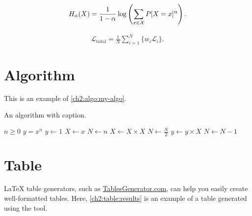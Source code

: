 \begin{equation}
\label{ch2:eq:renyi}
H_{\alpha}(X) =
\frac{1}{1-\alpha}
\log \left(\sum_{x \in {\cal X}}P[X=x]^{\alpha} \right) .
\end{equation}

\begin{equation}
\label{ch2:eq:total-loss}
\begin{aligned}
\mathcal{L}_{\textrm{total}} = \frac{1}{N}\sum_{i=1}^{N}\{w_i\mathcal{L}_i\}.
\end{aligned}
\end{equation}

\section{Algorithm}
\begin{paragraph}
This is an example of \autoref{ch2:algo:my-algo}.
\end{paragraph}

\begin{algorithm}[h]
\caption{An algorithm with caption.}
\label{ch2:algo:my-algo}
\normalsize\singlespacing
\begin{algorithmic}[1] %
    \Require $n \geq 0$
    \Ensure $y = x^n$
    \State $y \gets 1$
    \State $X \gets x$
    \State $N \gets n$
            \State $X \gets X \times X$
            \State $N \gets \frac{N}{2}$ 
            \State $y \gets y \times X$
            \State $N \gets N - 1$
        \EndIf
    \EndWhile
\end{algorithmic}
\end{algorithm}

\section{Table}
\begin{paragraph}
LaTeX table generators, such as \href{https://www.tablesgenerator.com/}{TablesGenerator.com}\footnotemark{}, can help you easily create well-formatted tables.
Here, \autoref{ch2:table:results} is an example of a table generated using the tool.
\end{paragraph}

